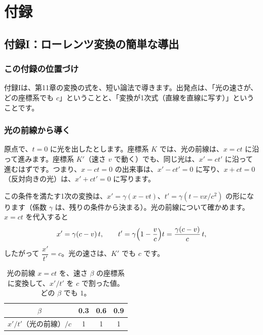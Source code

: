 \documentclass[a4paper,11pt,openany]{ltjsbook}
\begin{document}
\part{付録}

\chapter{付録I：ローレンツ変換の簡単な導出}

\section{この付録の位置づけ}

付録Iは、第11章の変換の式を、短い論法で導きます。出発点は、「光の速さが、どの座標系でも $c$」ということと、「変換が1次式（直線を直線に写す）」ということです。

\section{光の前線から導く}

原点で、$t=0$ に光を出したとします。座標系 $K$ では、光の前線は、$x=ct$ に沿って進みます。座標系 $K'$（速さ $v$ で動く）でも、同じ光は、$x'=ct'$ に沿って進むはずです。つまり、$x-ct=0$ の出来事は、$x'-ct'=0$ に写り、$x+ct=0$（反対向きの光）は、$x'+ct'=0$ に写ります。

この条件を満たす1次の変換は、$x'=\gamma(x-vt)$、$t'=\gamma(t-vx/c^2)$ の形になります（係数 $\gamma$ は、残りの条件から決まる）。光の前線について確かめます。$x=ct$ を代入すると
\[
x'=\gamma(c-v)\,t,\qquad t'=\gamma\Bigl(1-\frac vc\Bigr)t=\frac{\gamma(c-v)}{c}\,t,
\]
したがって $\dfrac{x'}{t'}=c$。光の速さは、$K'$ でも $c$ です。

\begin{table}[htbp]
\centering
\begin{tabular}{c|ccc}
\toprule
$\beta$ & 0.3 & 0.6 & 0.9\\
\midrule
$x'/t'$（光の前線）$/c$ & 1 & 1 & 1\\
\bottomrule
\end{tabular}
\caption{光の前線 $x=ct$ を、速さ $\beta$ の座標系に変換して、$x'/t'$ を $c$ で割った値。どの $\beta$ でも $1$。}
\end{table}
\end{document}
